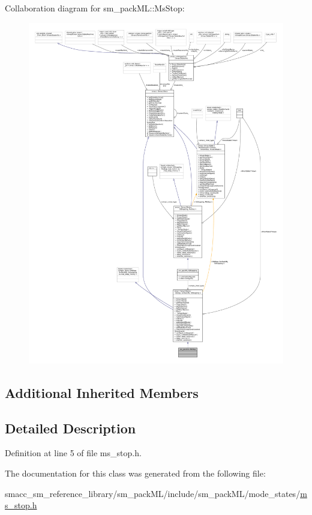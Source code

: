 Collaboration diagram for sm\+\_\+pack\+ML\+:\+:Ms\+Stop\+:
\nopagebreak
\begin{figure}[H]
\begin{center}
\leavevmode
\includegraphics[width=350pt]{classsm__packML_1_1MsStop__coll__graph}
\end{center}
\end{figure}
\subsection*{Additional Inherited Members}


\subsection{Detailed Description}


Definition at line 5 of file ms\+\_\+stop.\+h.



The documentation for this class was generated from the following file\+:\begin{DoxyCompactItemize}
\item 
smacc\+\_\+sm\+\_\+reference\+\_\+library/sm\+\_\+pack\+M\+L/include/sm\+\_\+pack\+M\+L/mode\+\_\+states/\hyperlink{ms__stop_8h}{ms\+\_\+stop.\+h}\end{DoxyCompactItemize}
